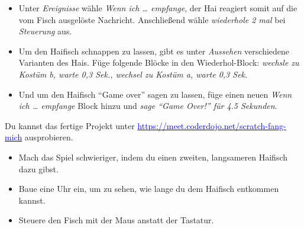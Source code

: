 \documentclass{article}
\begin{document}
\begin{itemize}[left=0pt]
    \item Unter \textit{Ereignisse} wähle \textit{Wenn ich … empfange}, der Hai reagiert somit auf die vom Fisch ausgelöste Nachricht. Anschließend wähle \textit{wiederhole 2 mal} bei \textit{Steuerung} aus.
    \item Um den Haifisch schnappen zu lassen, gibt es unter \textit{Aussehen} verschiedene Varianten des Hais. Füge folgende Blöcke in den Wiederhol-Block: \textit{wechsle zu Kostüm b, warte 0,3 Sek., wechsel zu Kostüm a, warte 0,3 Sek}.
    \item Und um den Haifisch “Game over” sagen zu lassen, füge einen neuen \textit{Wenn ich … empfange} Block hinzu und \textit{sage “Game Over!” für 4.5 Sekunden}.
\end{itemize}

\vspace{0.25cm}
\noindent
Du kannst das fertige Projekt unter \href{https://meet.coderdojo.net/scratch-fang-mich}{\textcolor{blue}{https://meet.coderdojo.net/scratch-fang-mich}} ausprobieren.
\vspace{0.5cm}


\begin{itemize}[left=0pt]
    \item Mach das Spiel schwieriger, indem du einen zweiten, langsameren Haifisch dazu gibst.
    \item Baue eine Uhr ein, um zu sehen, wie lange du dem Haifisch entkommen kannst.
    \item Steuere den Fisch mit der Maus anstatt der Tastatur.
\end{itemize}
\end{document}

